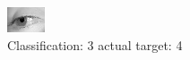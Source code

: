 \begin{figure}[h!]
\begin{center}
\includegraphics[width=0.60\columnwidth]{figures/ID2892_class_3_target_4.png}
\end{center}
\caption{ Classification: 3 actual target: 4}
\label{fig:ID2892_class_3_target_4}
\end{figure}
